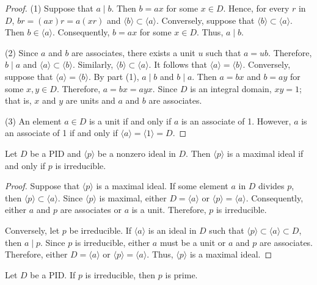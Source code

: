 \begin{proof}
(1)
Suppose that $a \mid b$. Then $b = ax$ for some $x \in D$. Hence, for
every $r$ in $D$, $br =(ax)r = a(xr)$ and $\langle b \rangle \subset
\langle a \rangle$. Conversely, suppose that $\langle b \rangle
\subset \langle a \rangle$. Then $b \in \langle a \rangle$.
Consequently, $b =a x$ for some $x \in D$.  Thus, $a \mid b$.
 

(2)
Since $a$ and $b$ are associates, there exists a unit $u$ such that 
$a = u b$.  Therefore, $b \mid a$ and $\langle a \rangle \subset 
\langle b \rangle$. Similarly, $\langle b \rangle \subset \langle a 
\rangle$. It follows that $\langle a \rangle = \langle b \rangle$.
Conversely, suppose that $\langle a \rangle = \langle b
\rangle$. By part (1), $a \mid b$ and $b \mid a$. Then $a = bx$ and $b
= ay$ for some $x, y \in D$. Therefore, $a = bx = ayx$. Since $D$ is
an integral domain, $x y =1$; that is, $x$ and $y$ are units and $a$
and $b$ are associates.   


(3)
An element $a \in D$ is a unit if and only if $a$ is an associate of
1. However, $a$ is an associate of 1 if and only if $\langle a \rangle
= \langle 1 \rangle = D$. 
\end{proof}


\begin{theorem}
Let $D$ be a PID and $\langle p \rangle$ be a nonzero ideal in $D$. 
Then $\langle p \rangle$ is a maximal ideal if and only if $p$ is
irreducible.
\end{theorem}


\begin{proof}
Suppose that $\langle p \rangle$ is a maximal ideal.  If some element
$a$ in $D$ divides $p$, then $\langle p \rangle \subset \langle a
\rangle$.  Since $\langle p \rangle$ is maximal, either $D = \langle
a \rangle$ or $\langle p \rangle = \langle a \rangle$.  Consequently,
either $a$ and $p$ are associates or $a$ is a unit.  Therefore, $p$
is irreducible.


Conversely, let $p$ be irreducible. If $\langle a \rangle$ is an
ideal in $D$ such that  $\langle p \rangle \subset \langle a \rangle
\subset D$, then $a \mid p$. Since $p$ is irreducible, either $a$ must
be a unit or $a$ and $p$ are associates. Therefore, either $D =
\langle a \rangle$ or $\langle p \rangle = \langle a \rangle$.  Thus,
$\langle p \rangle$ is a maximal ideal.
\end{proof}


\begin{corollary}\label{domains:irredPIDcorollary}
Let $D$ be a PID. If $p$ is irreducible, then $p$ is prime.
\end{corollary}


